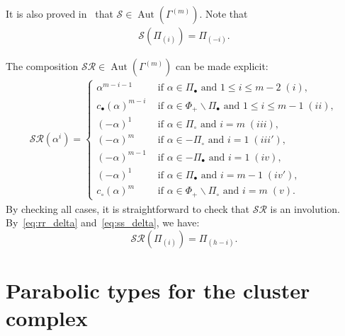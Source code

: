 \documentclass[11pt]{article}
\theoremstyle{definition}
\DeclareMathOperator{\Aut}{Aut}
\newcommand{\RR}{\mathcal{R}}
\renewcommand{\SS}{\mathcal{S}}
\DeclareMathOperator{\NC}{NC}
\begin{document}
It is also proved in~\cite{josuatverges} that $\SS\in\Aut(\Gamma^{(m)})$. Note that 
\begin{align} \label{eq:ss_delta}
    \SS( \varPi_{(i)} ) = \varPi_{(-i)}.
\end{align}

The composition $\SS\RR \in \Aut(\Gamma^{(m)})$ can be made explicit:
\begin{align} \label{eq:SSRR}
    \mathcal{SR}(\alpha^i) = 
    \begin{cases}
        \alpha^{m-i-1}  & \text{ if } \alpha \in \Pi_\bullet \text{ and } 1 \leq i \leq m-2 \;(i), \\
        c_\bullet(\alpha)^{m-i}  & \text{ if } \alpha \in \Phi_+ \backslash \Pi_\bullet \text{ and } 1 \leq i \leq m-1 \;(ii), \\
        (-\alpha)^1  & \text{ if } \alpha \in \Pi_\circ \text{ and } i = m \;(iii), \\
        (-\alpha)^m  & \text{ if } \alpha \in - \Pi_\circ \text{ and } i = 1 \;(iii'), \\
        (-\alpha)^{m-1}  & \text{ if } \alpha \in -\Pi_\bullet \text{ and } i = 1 \;(iv), \\
        (-\alpha)^1  & \text{ if } \alpha \in \Pi_\bullet \text{ and } i = m-1 \;(iv'), \\
        c_\circ (\alpha)^m & \text{ if } \alpha \in \Phi_+ \backslash \Pi_\circ \text{ and } i=m \;(v). 
    \end{cases}
\end{align}
By checking all cases, it is straightforward to check that $\SS\RR$ is an involution.  By~\eqref{eq:rr_delta} and~\eqref{eq:ss_delta}, we have:
\begin{equation} \label{eq:DeltaSSRR}
    \SS\RR( \varPi_{(i)}) = \varPi_{(h-i)}.
\end{equation}


\section{Parabolic types for the cluster complex}
\label{sec:parface}

\end{document}
